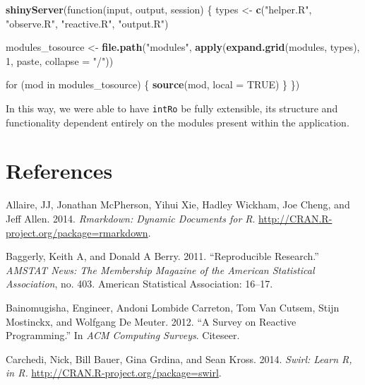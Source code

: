 \documentclass[12pt,]{article}
\newenvironment{Shaded}{\begin{snugshade}}{\end{snugshade}}
\newcommand{\KeywordTok}[1]{\textcolor[rgb]{0.13,0.29,0.53}{\textbf{{#1}}}}
\newcommand{\DataTypeTok}[1]{\textcolor[rgb]{0.13,0.29,0.53}{{#1}}}
\newcommand{\DecValTok}[1]{\textcolor[rgb]{0.00,0.00,0.81}{{#1}}}
\newcommand{\StringTok}[1]{\textcolor[rgb]{0.31,0.60,0.02}{{#1}}}
\newcommand{\OtherTok}[1]{\textcolor[rgb]{0.56,0.35,0.01}{{#1}}}
\newcommand{\NormalTok}[1]{{#1}}
\begin{document}
\begin{Shaded}
\begin{Highlighting}[]
\KeywordTok{shinyServer}\NormalTok{(function(input, output, session) \{}
    \NormalTok{types <-}\StringTok{ }\KeywordTok{c}\NormalTok{(}\StringTok{"helper.R"}\NormalTok{, }\StringTok{"observe.R"}\NormalTok{, }\StringTok{"reactive.R"}\NormalTok{, }
        \StringTok{"output.R"}\NormalTok{)}
    
    \NormalTok{modules_tosource <-}\StringTok{ }\KeywordTok{file.path}\NormalTok{(}\StringTok{"modules"}\NormalTok{, }\KeywordTok{apply}\NormalTok{(}\KeywordTok{expand.grid}\NormalTok{(modules, }
        \NormalTok{types), }\DecValTok{1}\NormalTok{, paste, }\DataTypeTok{collapse =} \StringTok{"/"}\NormalTok{))}
    
    \NormalTok{for (mod in modules_tosource) \{}
        \KeywordTok{source}\NormalTok{(mod, }\DataTypeTok{local =} \OtherTok{TRUE}\NormalTok{)}
    \NormalTok{\}}
\NormalTok{\})}
\end{Highlighting}
\end{Shaded}

\normalsize
In this way, we were able to have \texttt{intRo} be fully extensible,
its structure and functionality dependent entirely on the modules
present within the application.

\section*{References}\label{references}

\hypertarget{refs}{}
\hypertarget{ref-rmarkdown}{}
Allaire, JJ, Jonathan McPherson, Yihui Xie, Hadley Wickham, Joe Cheng,
and Jeff Allen. 2014. \emph{Rmarkdown: Dynamic Documents for R}.
\url{http://CRAN.R-project.org/package=rmarkdown}.

\hypertarget{ref-baggerly2011reproducible}{}
Baggerly, Keith A, and Donald A Berry. 2011. ``Reproducible Research.''
\emph{AMSTAT News: The Membership Magazine of the American Statistical
Association}, no. 403. American Statistical Association: 16--17.

\hypertarget{ref-bainomugisha2012survey}{}
Bainomugisha, Engineer, Andoni Lombide Carreton, Tom Van Cutsem, Stijn
Mostinckx, and Wolfgang De Meuter. 2012. ``A Survey on Reactive
Programming.'' In \emph{ACM Computing Surveys}. Citeseer.

\hypertarget{ref-swirl}{}
Carchedi, Nick, Bill Bauer, Gina Grdina, and Sean Kross. 2014.
\emph{Swirl: Learn R, in R.}
\url{http://CRAN.R-project.org/package=swirl}.
\end{document}

